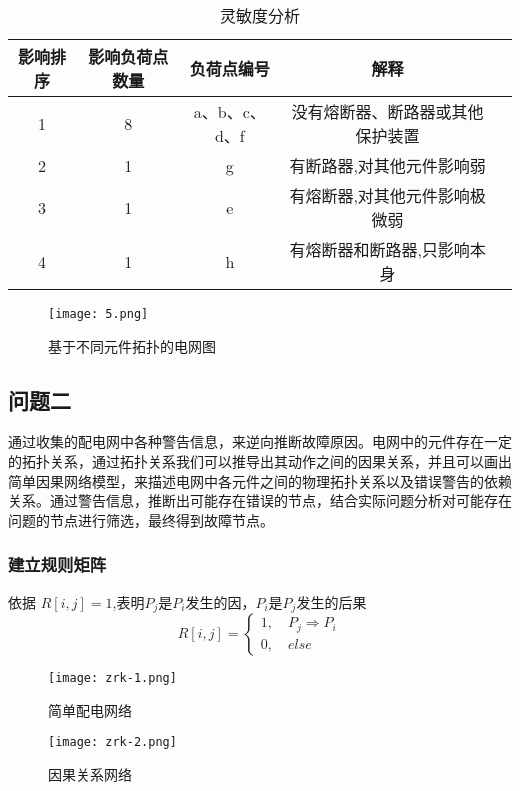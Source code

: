\documentclass[withoutpreface,bwprint]{cumcmthesis} %
\begin{document}
\begin{table}[!htbp]
    \caption{灵敏度分析}\centering
    \begin{tabular}{ccccc}
        \toprule[1.5pt]
        影响排序 & 影响负荷点数量 & 负荷点编号 & 解释\\  
        \midrule[1pt]
        1 & 8 & a、b、c、d、f & 没有熔断器、断路器或其他保护装置\\
        2 & 1 & g & 有断路器,对其他元件影响弱\\
        3 & 1 & e & 有熔断器,对其他元件影响极微弱\\
        4 & 1 & h & 有熔断器和断路器,只影响本身\\
        \bottomrule[1.5pt]
    \end{tabular}
\end{table}

\begin{figure}[H]
    \centering
    \texttt{[image: 5.png]}
    \caption{基于不同元件拓扑的电网图} 
\end{figure}

\subsection{问题二}
通过收集的配电网中各种警告信息，来逆向推断故障原因。电网中的元件存在一定的拓扑关系，通过拓扑关系我们可以推导出其动作之间的因果关系，并且可以画出简单因果网络模型\cite{yy5}，来描述电网中各元件之间的物理拓扑关系以及错误警告的依赖关系。通过警告信息，推断出可能存在错误的节点，结合实际问题分析对可能存在问题的节点进行筛选，最终得到故障节点。  

\subsubsection{建立规则矩阵}
依据 $R[i,j] = 1$,表明$P_j$是$P_i$发生的因，$P_i$是$P_j$发生的后果
\begin{equation}
        R[i,j] = 
        \begin{cases}
            1 , \quad P_j \Rightarrow P_i \\
            0 , \quad else
        \end{cases}
\end{equation}

\begin{figure}[htbp]
    \centering
    \texttt{[image: zrk-1.png]}
    \caption{简单配电网络}
    \label{zrk-1}
\end{figure}

\begin{figure}[htbp]
    \centering
    \texttt{[image: zrk-2.png]}
    \caption{因果关系网络}
    \label{zrk-2}
\end{figure}
\end{document}
